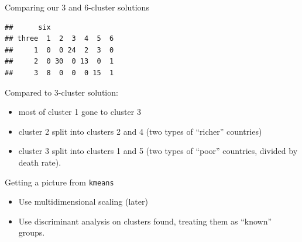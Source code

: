 \begin{frame}[fragile]{Comparing our 3 and 6-cluster solutions}
  
\begin{knitrout}
\color{fgcolor}\begin{kframe}
\begin{alltt}
\hlstd{(}\hlopt{$}\hlopt{$}
\end{alltt}
\begin{verbatim}
##      six
## three  1  2  3  4  5  6
##     1  0  0 24  2  3  0
##     2  0 30  0 13  0  1
##     3  8  0  0  0 15  1
\end{verbatim}
\end{kframe}
\end{knitrout}

Compared to 3-cluster solution:

\begin{itemize}
\item most of cluster 1 gone to cluster 3
\item cluster 2 split into clusters 2 and 4 (two types of ``richer'' countries)
\item cluster 3 split into clusters 1 and 5 (two types of ``poor''
  countries, divided by death rate).
\end{itemize}
  
\end{frame}


\begin{frame}[fragile]{Getting a picture from \texttt{kmeans}}
  
  \begin{itemize}
  \item Use multidimensional scaling (later)
  \item Use discriminant analysis on clusters found, treating them as
    ``known'' groups.
  \end{itemize}
  
\end{frame}


